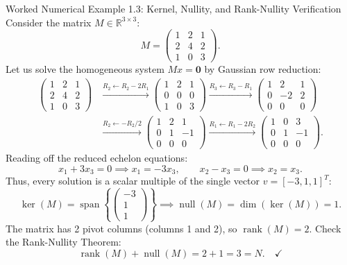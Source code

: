 \documentclass[11pt]{article}
\begin{document}
\begin{callbox}{Worked Numerical Example 1.3: Kernel, Nullity, and Rank-Nullity Verification}
Consider the matrix $M \in \mathbb{R}^{3 \times 3}$:
\begin{equation}
  M = \begin{pmatrix}
    1 & 2 & 1 \\
    2 & 4 & 2 \\
    1 & 0 & 3
  \end{pmatrix}.
\end{equation}
Let us solve the homogeneous system $M x = \mathbf{0}$ by Gaussian row reduction:
\begin{align}
  \begin{pmatrix}
    1 & 2 & 1 \\
    2 & 4 & 2 \\
    1 & 0 & 3
  \end{pmatrix}
  &\xrightarrow{R_2 \leftarrow R_2 - 2R_1}
  \begin{pmatrix}
    1 & 2 & 1 \\
    0 & 0 & 0 \\
    1 & 0 & 3
  \end{pmatrix}
  \xrightarrow{R_3 \leftarrow R_3 - R_1}
  \begin{pmatrix}
    1 & 2 & 1 \\
    0 & -2 & 2 \\
    0 & 0 & 0
  \end{pmatrix} \nonumber \\
  &\xrightarrow{R_2 \leftarrow -R_2/2}
  \begin{pmatrix}
    1 & 2 & 1 \\
    0 & 1 & -1 \\
    0 & 0 & 0
  \end{pmatrix}
  \xrightarrow{R_1 \leftarrow R_1 - 2R_2}
  \begin{pmatrix}
    1 & 0 & 3 \\
    0 & 1 & -1 \\
    0 & 0 & 0
  \end{pmatrix}.
\end{align}
Reading off the reduced echelon equations:
\begin{equation}
  x_1 + 3x_3 = 0 \implies x_1 = -3x_3, \qquad x_2 - x_3 = 0 \implies x_2 = x_3.
\end{equation}
Thus, every solution is a scalar multiple of the single vector $v = [-3, 1, 1]^T$:
\begin{equation}
  \ker(M) = \operatorname{span}\left\{ \begin{pmatrix} -3 \\ 1 \\ 1 \end{pmatrix} \right\} \implies \operatorname{null}(M) = \dim(\ker(M)) = 1.
\end{equation}
The matrix has 2 pivot columns (columns 1 and 2), so $\operatorname{rank}(M) = 2$.
Check the Rank-Nullity Theorem:
\begin{equation}
  \operatorname{rank}(M) + \operatorname{null}(M) = 2 + 1 = 3 = N. \quad \checkmark
\end{equation}
\end{callbox}
\end{document}
